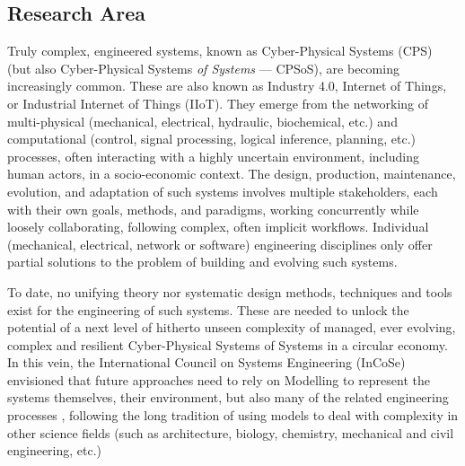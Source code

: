 \subsection{Research Area}
\label{sec:ResearchArea}


Truly complex, engineered systems, known as Cyber-Physical Systems (CPS) (but
also Cyber-Physical Systems \emph{of Systems} --- CPSoS), are becoming increasingly 
common. These are also known as Industry 4.0, Internet of Things, or  Industrial 
Internet of Things (IIoT). 
They emerge from the networking of multi-physical (mechanical, electrical, hydraulic,
biochemical, etc.) and computational (control, signal processing, logical inference, 
planning, etc.) processes, often interacting with a highly uncertain environment, 
including human actors, in a socio-economic context. 
The design, production, maintenance, evolution, and adaptation of such systems 
involves multiple stakeholders, each with their own goals, methods, and paradigms, 
working concurrently while loosely collaborating, following complex, often implicit
workflows. Individual (mechanical, electrical, network or software) engineering 
disciplines only offer partial solutions to the problem of building and evolving 
such systems. 

To date, no unifying theory nor systematic design methods, techniques and tools exist
for the engineering of such systems. These are needed to unlock the potential of a next
level of hitherto unseen complexity of managed, ever evolving, complex and resilient
Cyber-Physical Systems of Systems in a circular economy. In this vein, the
International Council on Systems Engineering (InCoSe) envisioned that future
approaches need to rely on Modelling to represent the systems themselves, their 
environment, but also many of the related engineering processes \cite{TR:InCoSe-Vision:2021}, 
following the long tradition of using models to deal with complexity in other science fields
(such as architecture, biology, chemistry, mechanical and civil engineering, etc.)

